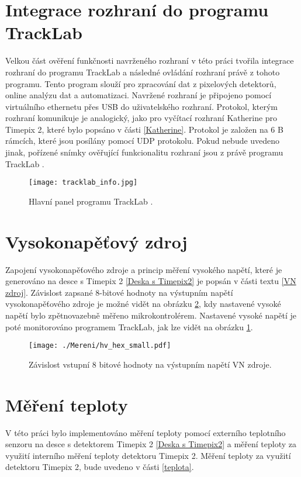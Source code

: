 \section{Integrace rozhraní do programu TrackLab}
Velkou část ověření funkčnosti navrženého rozhraní v této práci tvořila integrace rozhraní do programu TrackLab \cite{Manek_2024} a následné ovládání rozhraní právě z tohoto programu. Tento program slouží pro zpracování dat z pixelových detektorů, online analýzu dat a automatizaci. Navržené rozhraní je připojeno pomocí virtuálního ethernetu přes USB do uživatelského rozhraní. Protokol, kterým rozhraní komunikuje je analogický, jako pro vyčítací rozhraní Katherine pro Timepix 2, které bylo popsáno v části \ref{Katherine}. Protokol je založen na 6 B rámcích, které jsou posílány pomocí UDP protokolu. Pokud nebude uvedeno jinak, pořízené snímky ověřující funkcionalitu rozhraní jsou z právě programu TrackLab \cite{Manek_2024}.

\begin{figure}[h!]
	\centering
	\captionsetup{justification=centering}
	\texttt{[image: tracklab\_info.jpg]}
	\caption{Hlavní panel programu TrackLab \cite{Manek_2024}.} 
	\label{fig:Tracklab}
\end{figure}

\section{Vysokonapěťový zdroj}
Zapojení vysokonapěťového zdroje a princip měření vysokého napětí, které je generováno na desce s Timepix 2 \ref{Deska s Timepix2} je popsán v části textu \ref{VN zdroj}. Závislost zapsané 8-bitové hodnoty na výstupním napětí vysokonapěťového zdroje je možné vidět na obrázku \ref{fig:hv_hex}, kdy nastavené vysoké napětí bylo zpětnovazebně měřeno mikrokontrolérem. Nastavené vysoké napětí je poté monitorováno programem TrackLab, jak lze vidět na obrázku \ref{fig:Tracklab}.
\begin{figure}[h!]
	\centering
	\captionsetup{justification=centering}
	\texttt{[image: ./Mereni/hv\_hex\_small.pdf]}
	\caption{Závislost vstupní 8 bitové hodnoty na výstupním napětí VN zdroje.} 
	\label{fig:hv_hex}
\end{figure}



\section{Měření teploty}
V této práci bylo implementováno měření teploty pomocí externího teplotního senzoru na desce s detektorem Timepix 2 \ref{Deska s Timepix2} a měření teploty za využití interního měření teploty detektoru Timepix 2. Měření teploty za využití detektoru Timepix 2, bude uvedeno v části \ref{teplota}.
